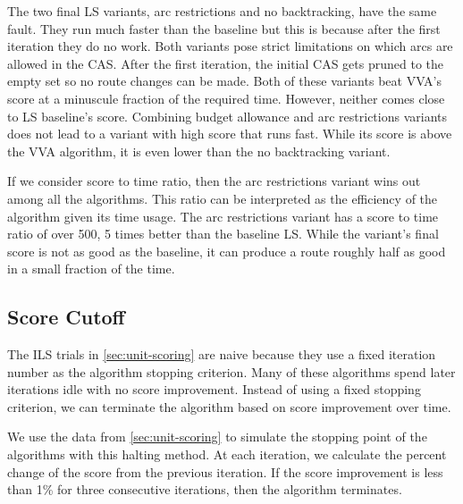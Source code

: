 \documentclass[honors]{union-cs-thesis}
\begin{document}
The two final LS variants, arc restrictions and no backtracking, have the same fault. They run much faster than the baseline but this is because after the first iteration they do no work. Both variants pose strict limitations on which arcs are allowed in the CAS. After the first iteration, the initial CAS gets pruned to the empty set so no route changes can be made. Both of these variants beat VVA's score at a minuscule fraction of the required time. However, neither comes close to LS baseline's score. Combining budget allowance and arc restrictions variants does not lead to a variant with high score that runs fast. While its score is above the VVA algorithm, it is even lower than the no backtracking variant.

If we consider score to time ratio, then the arc restrictions variant wins out among all the algorithms. This ratio can be interpreted as the efficiency of the algorithm given its time usage. The arc restrictions variant has a score to time ratio of over 500, 5 times better than the baseline LS. While the variant's final score is not as good as the baseline, it can produce a route roughly half as good in a small fraction of the time.


\subsection{Score Cutoff}
\label{sec:score-cutoff}
The ILS trials in \cref{sec:unit-scoring} are naive because they use a fixed iteration number as the algorithm stopping criterion. Many of these algorithms spend later iterations idle with no score improvement. Instead of using a fixed stopping criterion, we can terminate the algorithm based on score improvement over time. 

We use the data from \cref{sec:unit-scoring} to simulate the stopping point of the algorithms with this halting method. At each iteration, we calculate the percent change of the score from the previous iteration. If the score improvement is less than 1\% for three consecutive iterations, then the algorithm terminates.    
\end{document}
